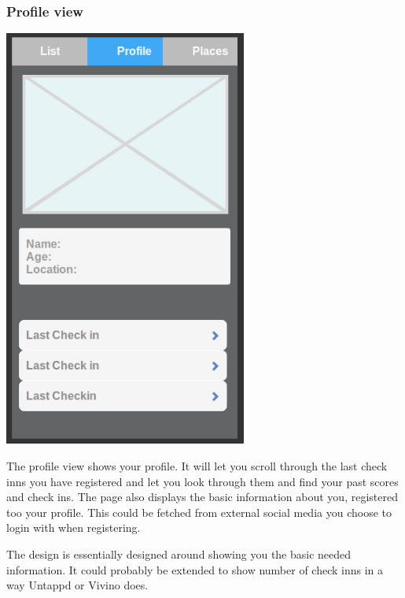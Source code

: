 \documentclass[12pt]{article}
\begin{document}
\subsubsection{Profile view}
\includegraphics[width=8cm]{pictures/prototype/profile}
\bigbreak

The profile view shows your profile. It will let you scroll through the last
check inns you have registered and let you look through them and find your past
scores and check ins. The page also displays the basic information about you,
registered too your profile. This could be fetched from external social media
you choose to login with when registering.

The design is essentially designed around showing you the basic needed
information. It could probably be extended to show number of check inns in a way
Untappd or Vivino does. 
\end{document}
